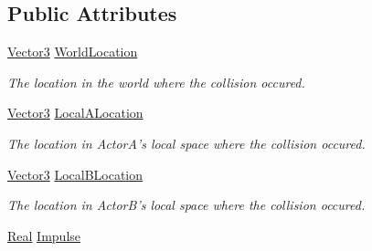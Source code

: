 \subsection*{Public Attributes}
\begin{DoxyCompactItemize}
\item 
\hypertarget{classphys_1_1EventCollision_a8f8a80d921bfe1ec24171c5be3ed7641}{
\hyperlink{classphys_1_1Vector3}{Vector3} \hyperlink{classphys_1_1EventCollision_a8f8a80d921bfe1ec24171c5be3ed7641}{WorldLocation}}
\label{dd/de9/classphys_1_1EventCollision_a8f8a80d921bfe1ec24171c5be3ed7641}

\begin{DoxyCompactList}\small\item\em The location in the world where the collision occured. \item\end{DoxyCompactList}\item 
\hypertarget{classphys_1_1EventCollision_a2fa146b8453d2f504abcd5055d2c2a90}{
\hyperlink{classphys_1_1Vector3}{Vector3} \hyperlink{classphys_1_1EventCollision_a2fa146b8453d2f504abcd5055d2c2a90}{LocalALocation}}
\label{dd/de9/classphys_1_1EventCollision_a2fa146b8453d2f504abcd5055d2c2a90}

\begin{DoxyCompactList}\small\item\em The location in ActorA's local space where the collision occured. \item\end{DoxyCompactList}\item 
\hypertarget{classphys_1_1EventCollision_a50d6df6b25532530cd296353ac0b55c6}{
\hyperlink{classphys_1_1Vector3}{Vector3} \hyperlink{classphys_1_1EventCollision_a50d6df6b25532530cd296353ac0b55c6}{LocalBLocation}}
\label{dd/de9/classphys_1_1EventCollision_a50d6df6b25532530cd296353ac0b55c6}

\begin{DoxyCompactList}\small\item\em The location in ActorB's local space where the collision occured. \item\end{DoxyCompactList}\item 
\hypertarget{classphys_1_1EventCollision_a577552db818f54a4092baccf597823a2}{
\hyperlink{namespacephys_af7eb897198d265b8e868f45240230d5f}{Real} \hyperlink{classphys_1_1EventCollision_a577552db818f54a4092baccf597823a2}{Impulse}}
\label{dd/de9/classphys_1_1EventCollision_a577552db818f54a4092baccf597823a2}


\end{DoxyCompactItemize}
